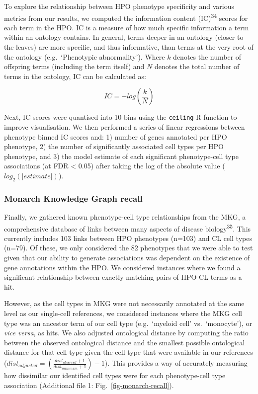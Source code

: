 \documentclass[
]{article}
\begin{document}
To explore the relationship between HPO phenotype specificity and
various metrics from our results, we computed the information content
(IC)\textsuperscript{34} scores for each term in the HPO. IC is a
measure of how much specific information a term within an ontology
contains. In general, terms deeper in an ontology (closer to the leaves)
are more specific, and thus informative, than terms at the very root of
the ontology (e.g.~`Phenotypic abnormality'). Where \(k\) denotes the
number of offspring terms (including the term itself) and \(N\) denotes
the total number of terms in the ontology, IC can be calculated as:

\[
IC=-log(\frac{k}{N})
\]

Next, IC scores were quantised into 10 bins using the \texttt{ceiling} R
function to improve visualisation. We then performed a series of linear
regressions between phenotype binned IC scores and: 1) number of genes
annotated per HPO phenotype, 2) the number of significantly associated
cell types per HPO phenotype, and 3) the model estimate of each
significant phenotype-cell type associations (at FDR \textless{} 0.05)
after taking the log of the absolute value (\(log_2(|estimate|)\)).

\subsubsection{Monarch Knowledge Graph
recall}\label{monarch-knowledge-graph-recall}

Finally, we gathered known phenotype-cell type relationships from the
MKG, a comprehensive database of links between many aspects of disease
biology\textsuperscript{35}. This currently includes 103 links between
HPO phenotypes (n=103) and CL cell types (n=79). Of these, we only
considered the 82 phenotypes that we were able to test given that our
ability to generate associations was dependent on the existence of gene
annotations within the HPO. We considered instances where we found a
significant relationship between exactly matching pairs of HPO-CL terms
as a hit.

However, as the cell types in MKG were not necessarily annotated at the
same level as our single-cell references, we considered instances where
the MKG cell type was an ancestor term of our cell type (e.g.~`myeloid
cell' vs.~`monocyte'), or \emph{vice versa}, as hits. We also adjusted
ontological distance by computing the ratio between the observed
ontological distance and the smallest possible ontological distance for
that cell type given the cell type that were available in our references
(\(dist_{adjusted}=(\frac{dist_{observed}+1}{dist_{minimum}+1})-1\)).
This provides a way of accurately measuring how dissimilar our
identified cell types were for each phenotype-cell type association
(Additional file 1: Fig.~\ref{fig-monarch-recall}).
\end{document}

